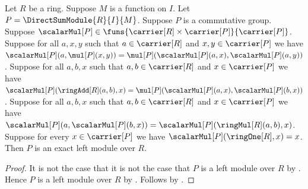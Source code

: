 \begin{theorem}\label{spike_direct_sum_module_intro}
    Let $R$ be a ring.
    Suppose $M$ is a function on $I$.
    Let $P=\DirectSumModule{R}{I}{M}$.
    Suppose $P$ is a commutative group.
    Suppose
        $\scalarMul[P]\in
            \funs{\carrier[R]\times\carrier[P]}{\carrier[P]}$.
    Suppose for all $a,x,y$ such that $a\in\carrier[R]$ and
        $x,y\in\carrier[P]$ we have
        $\scalarMul[P](a,\mul[P](x,y))
            =\mul[P](\scalarMul[P](a,x),\scalarMul[P](a,y))$.
    Suppose for all $a,b,x$ such that $a,b\in\carrier[R]$ and
        $x\in\carrier[P]$ we have
        $\scalarMul[P](\ringAdd[R](a,b),x)
            =\mul[P](\scalarMul[P](a,x),\scalarMul[P](b,x))$.
    Suppose for all $a,b,x$ such that $a,b\in\carrier[R]$ and
        $x\in\carrier[P]$ we have
        $\scalarMul[P](a,\scalarMul[P](b,x))
            =\scalarMul[P](\ringMul[R](a,b),x)$.
    Suppose for every $x\in\carrier[P]$ we have
        $\scalarMul[P](\ringOne[R],x)=x$.
    Then $P$ is an exact left module over $R$.
\end{theorem}
\begin{proof}
    It is not the case that it is not the case that
        $P$ is a left module over $R$ by
        .
    Hence $P$ is a left module over $R$ by \auto.
    Follows by
        .
\end{proof}

